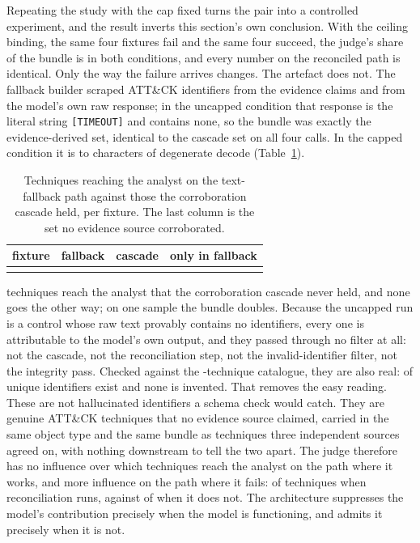Repeating the study with the cap fixed turns the pair into a controlled experiment, and the result
inverts this section's own conclusion. With the ceiling binding, the same four fixtures fail and the
same four succeed, the judge's share of the bundle is  in both conditions,
and every number on the reconciled path is identical. Only the way the failure arrives changes. The
artefact does not. The fallback builder scraped ATT\&CK identifiers from the evidence claims and
from the model's own raw response; in the uncapped condition that response is the literal string
\texttt{{[}TIMEOUT{]}} and contains none, so the bundle was exactly the evidence-derived set,
identical to the cascade set on all four calls. In the capped condition it is
 to  characters of degenerate decode
(Table~\ref{tab:fallback}).

\begin{table}[!htbp]
\caption{Techniques reaching the analyst on the text-fallback path against those the corroboration cascade held, per fixture. The last column is the set no evidence source corroborated.}\label{tab:fallback}
\centering\small
\begin{tabular}{@{}llll@{}}
\toprule
fixture & fallback & cascade & only in fallback \\
\midrule
 \\
\bottomrule
\end{tabular}
\end{table}

 techniques reach the analyst that the corroboration cascade never held,
and none goes the other way; on one sample the bundle doubles. Because the uncapped run is a control
whose raw text provably contains no identifiers, every one is attributable to the model's own output, and
they passed through no filter at all: not the cascade, not the reconciliation step, not the
invalid-identifier filter, not the integrity pass. Checked against the -technique catalogue, they are also real:
 of  unique identifiers exist
and none is invented. That removes the easy reading. These are not hallucinated identifiers a schema
check would catch. They are genuine ATT\&CK techniques that no evidence source claimed, carried in
the same object type and the same bundle as techniques three independent sources agreed on, with
nothing downstream to tell the two apart. The judge therefore has no influence over which techniques reach the analyst on the path where it
works, and more influence on the path where it fails:  of
 techniques when reconciliation runs, against 
of  when it does not. The architecture suppresses the model's
contribution precisely when the model is functioning, and admits it precisely when it is not.

